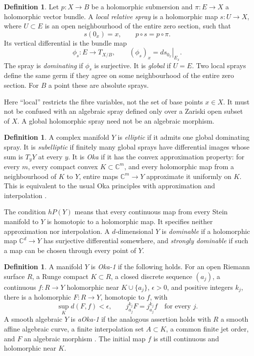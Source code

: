 \documentclass[12pt]{amsart}
\theoremstyle{definition}
\newtheorem{defn}[thm]{Definition}
\theoremstyle{remark}
\numberwithin{equation}{section}
\newcommand{\C}{\mathbb{C}}
\begin{document}
\begin{defn}\label{en:spraydef}
Let $p:X\to B$ be a holomorphic submersion and $\pi:E\to X$ a holomorphic vector bundle. A \emph{local relative spray} is a holomorphic map $s:U\to X$, where $U\subset E$ is an open neighbourhood of the entire zero section, such that
\[
s(0_x)=x,\qquad p\circ s=p\circ\pi.
\]
Its vertical differential is the bundle map
\[
\phi_s:E\longrightarrow T_{X/B},\qquad
(\phi_s)_x=\left.ds_{0_x}\right|_{E_x}.
\]
The spray is \emph{dominating} if $\phi_s$ is surjective. It is \emph{global} if $U=E$. Two local sprays define the same germ if they agree on some neighbourhood of the entire zero section. For $B$ a point these are absolute sprays.
\end{defn}

Here ``local'' restricts the fibre variables, not the set of base points $x\in X$. It must not be confused with an algebraic spray defined only over a Zariski open subset of $X$. A global holomorphic spray need not be an algebraic morphism.

\begin{defn}
A complex manifold $Y$ is \emph{elliptic} if it admits one global dominating spray. It is \emph{subelliptic} if finitely many global sprays have differential images whose sum is $T_yY$ at every $y$. It is \emph{Oka} if it has the convex approximation property: for every $m$, every compact convex $K\subset\C^m$, and every holomorphic map from a neighbourhood of $K$ to $Y$, entire maps $\C^m\to Y$ approximate it uniformly on $K$. This is equivalent to the usual Oka principles with approximation and interpolation \cite{en:Book}.

The condition $hP(Y)$ means that every continuous map from every Stein manifold to $Y$ is homotopic to a holomorphic map. It specifies neither approximation nor interpolation. A $d$-dimensional $Y$ is \emph{dominable} if a holomorphic map $\C^d\to Y$ has surjective differential somewhere, and \emph{strongly dominable} if such a map can be chosen through every point of $Y$.
\end{defn}

\begin{defn}\label{en:okaone}
A manifold $Y$ is \emph{Oka-1} if the following holds. For an open Riemann surface $R$, a Runge compact $K\subset R$, a closed discrete sequence $(a_j)$, a continuous $f:R\to Y$ holomorphic near $K\cup\{a_j\}$, $\epsilon>0$, and positive integers $k_j$, there is a holomorphic $F:R\to Y$, homotopic to $f$, with
\[
\sup_K d(F,f)<\epsilon,\qquad j^{k_j}_{a_j}F=j^{k_j}_{a_j}f\quad\text{for every }j.
\]
A smooth algebraic $Y$ is \emph{aOka-1} if the analogous assertion holds with $R$ a smooth affine algebraic curve, a finite interpolation set $A\subset K$, a common finite jet order, and $F$ an algebraic morphism \cite{en:AF,en:FLone}. The initial map $f$ is still continuous and holomorphic near $K$.
\end{defn}
\end{document}

